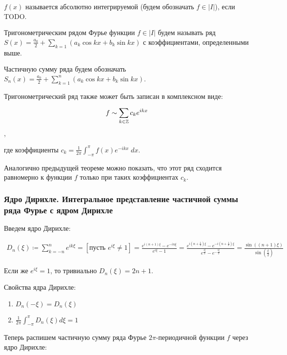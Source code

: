 \Endproof

\Def $f(x)$ называется абсолютно интегрируемой (будем обозначать $f \in |I|$), если TODO.

\Def Тригонометрическим рядом Фурье функции $f \in |I|$ будем называть ряд $S(x) = \frac{a_0}{2} + \sum_{k=1} \left(a_k \cos kx + b_k \sin kx\right)$ с коэффициентами, определенными выше.

Частичную сумму ряда будем обозначать $S_n(x) = \frac{a_0}{2} + \sum_{k=1}^n \left(a_k \cos kx + b_k \sin kx\right)$.

\Note Тригонометрический ряд также может быть записан в комплексном виде:

\begin{equation*}
    f \sim \sum_{k \in \mathbb{Z}} c_k e^{ikx}
\end{equation*}, 

где коэффициенты $c_k = \frac{1}{2\pi} \int_{-\pi}^{\pi} f(x) e^{-ikx} \; dx$.

Аналогично предыдущей теореме можно показать, что этот ряд сходится равномерно к функции $f$ только при таких коэффициентах $c_k$.

\subsubsection{Ядро Дирихле. Интегральное представление частичной суммы ряда Фурье с ядром Дирихле}

Введем ядро Дирихле:

\begin{align*}
    D_n(\xi) \coloneqq \sum_{k=-n}^n e^{ik\xi} = [\text{пусть } e^{i\xi} \neq 1] = \frac{e^{i(n+1)\xi} - e^{-in\xi}}{e^{i\xi} - 1} = \frac{e^{i(n+\frac{1}{2})\xi} - e^{-i(n+\frac{1}{2})\xi}}{e^{\frac{i\xi}{2}} - e^{-\frac{i\xi}{2}}} = \frac{\sin((n+1)\xi)}{\sin\left(\frac{\xi}{2}\right)}
\end{align*}

Если же $e^{i\xi} = 1$, то тривиально $D_n(\xi) = 2n+1$.

Свойства ядра Дирихле:
\begin{enumerate}
    \item $D_n(-\xi) = D_n(\xi)$
    \item $\frac{1}{2\pi} \int_{-\pi}^{\pi} D_n(\xi) d\xi = 1$
\end{enumerate}

Теперь распишем частичную сумму ряда Фурье $2\pi$-периодичной функции $f$ через ядро Дирихле:

